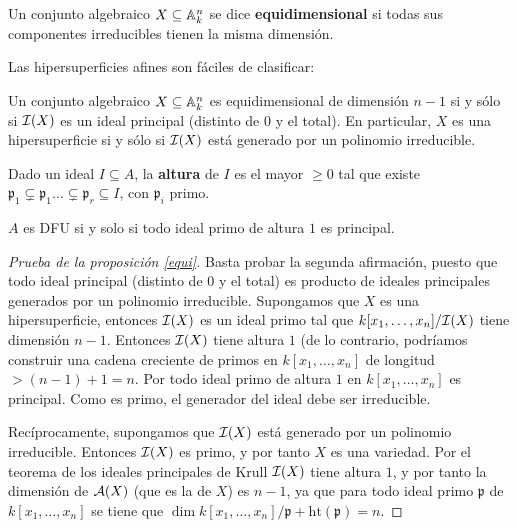 \documentclass[ACGA.tex]{subfiles}
\begin{document}
\begin{defi}
 Un conjunto algebraico $X\subseteq \mathbb{A}^n_k$ se dice {\bf equidimensional} si todas sus componentes irreducibles tienen la misma dimensión.
\end{defi}


Las hipersuperficies afines son fáciles de clasificar:

\begin{prop}\label{equi}
 Un conjunto algebraico $X\subseteq\mathbb{A}^n_k$ es equidimensional de dimensión $n-1$ si y sólo si $\mathcal{I}(X)$ es un ideal principal (distinto de $0$ y el total). En particular, $X$ es una hipersuperficie si y sólo si $\mathcal{I}(X)$ está generado por un polinomio irreducible.
\end{prop}

\begin{defi}
Dado un ideal $I\subseteq A$, la {\bf altura } de $I$ es el mayor $\geq 0$ tal que existe $\mathfrak{p}_1\subsetneq\mathfrak{p}_1\dots\subsetneq\mathfrak{p}_r\subseteq I$, con $\mathfrak{p}_i$ primo. 
\end{defi}

\begin{prop}
$A$ es DFU si y solo si todo ideal primo de altura $1$ es principal. 
\end{prop}

\begin{proof}[Prueba de la proposición \ref{equi}]
 Basta probar la segunda afirmación, puesto que todo ideal principal (distinto de $0$ y el total) es producto de ideales principales generados por un polinomio irreducible. Supongamos que $X$ es una hipersuperficie, entonces $\mathcal{I}(X)$ es un ideal primo tal que $k[x_1,\ldots,x_n]/\mathcal{I}(X)$ tiene dimensión $n-1$. Entonces $\mathcal{I}(X)$ tiene altura $1$ (de lo contrario, podríamos construir una cadena creciente de primos en $k[x_1,\ldots,x_n]$ de longitud $>(n-1)+1=n$. Por \cite[Proposition 1.12A]{h} todo ideal primo de altura $1$ en $k[x_1,\ldots,x_n]$ es principal. Como es primo, el generador del ideal debe ser irreducible.

Recíprocamente, supongamos que $\mathcal{I}(X)$ está generado por un polinomio irreducible. Entonces $\mathcal{I}(X)$ es primo, y por tanto $X$ es una variedad. Por el teorema de los ideales principales de Krull \cite[Corolario 11.17]{am} $\mathcal{I}(X)$ tiene altura $1$, y por tanto la dimensión de $\mathcal{A}(X)$ (que es la de $X$) es $n-1$, ya que para todo ideal primo $\mathfrak p$ de $k[x_1,\ldots,x_n]$ se tiene que $\dim k[x_1,\ldots,x_n]/{\mathfrak p}+\mathrm{ht}({\mathfrak p})=n$.
\end{proof}
\end{document}
